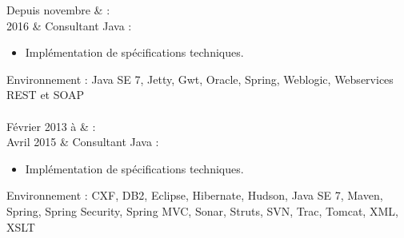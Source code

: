 Depuis novembre &  : \\%
2016 & Consultant Java :%
\begin{itemize}%
    \item Implémentation de spécifications techniques.%
\end{itemize}%
Environnement : Java SE 7, Jetty, Gwt, Oracle, Spring, Weblogic, Webservices REST et SOAP \\\\

Février 2013 à & : \\%
Avril 2015 & Consultant Java :%
\begin{itemize}%
    \item Implémentation de spécifications techniques.%
\end{itemize}%
Environnement : CXF, DB2, Eclipse, Hibernate, Hudson, Java SE 7, Maven, Spring, Spring Security, Spring MVC, Sonar, Struts, SVN, Trac, Tomcat, XML, XSLT \\